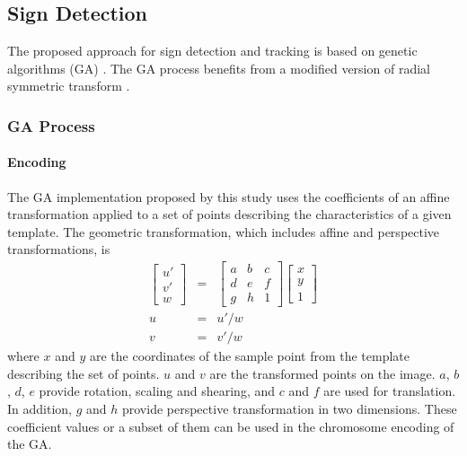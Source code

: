 \documentclass[review,number]{elsarticle}
\begin{document}
\subsection{Sign Detection}
The proposed approach for sign detection and tracking is based on genetic algorithms (GA) \cite{miscbib05}. The GA process benefits from a modified version of radial symmetric transform \cite{signbib26}. 

\subsubsection{GA Process}

\paragraph{Encoding}
The GA implementation proposed by this study uses the coefficients of an affine transformation applied to a set of points describing the characteristics of a given template. The geometric transformation, which includes affine and perspective transformations, is
\begin{eqnarray}
\label{eq4}
\begin{bmatrix}
  u'\\
  v'\\
  w
\end{bmatrix}
&=&
\begin{bmatrix}
  a & b & c\\
  d & e & f\\
  g & h & 1
\end{bmatrix}
\begin{bmatrix}
  x\\
  y\\
  1
\end{bmatrix}\\
\nonumber u &=& u'/w \\
\nonumber v &=& v'/w
\end{eqnarray}
\noindent where $x$ and $y$ are the coordinates of the sample point from the template describing the set of points. $u$ and $v$ are the transformed points on the image. $a$, $b$, $d$, $e$ provide rotation, scaling and shearing, and $c$ and $f$ are used for translation. In addition, $g$ and $h$ provide perspective transformation in two dimensions. These coefficient values or a subset of them can be used in the chromosome encoding of the GA.
\end{document}
